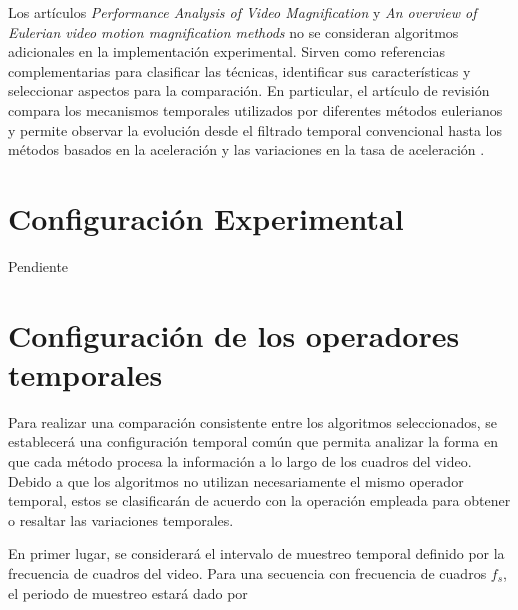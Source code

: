 Los artículos \textit{Performance Analysis of Video Magnification} y \textit{An overview of Eulerian video motion magnification methods} no se consideran algoritmos adicionales en la implementación experimental. Sirven como referencias complementarias para clasificar las técnicas, identificar sus características y seleccionar aspectos para la comparación. En particular, el artículo de revisión compara los mecanismos temporales utilizados por diferentes métodos eulerianos y permite observar la evolución desde el filtrado temporal convencional hasta los métodos basados en la aceleración y las variaciones en la tasa de aceleración \cite{ahmed2023overview,yadav2020performance}.\\









\section{Configuración Experimental}
Pendiente

\section{Configuración de los operadores temporales}

Para realizar una comparación consistente entre los algoritmos seleccionados, se establecerá una configuración temporal común que permita analizar la forma en que cada método procesa la información a lo largo de los cuadros del video. Debido a que los algoritmos no utilizan necesariamente el mismo operador temporal, estos se clasificarán de acuerdo con la operación empleada para obtener o resaltar las variaciones temporales.

En primer lugar, se considerará el intervalo de muestreo temporal definido por la frecuencia de cuadros del video. Para una secuencia con frecuencia de cuadros \(f_s\), el periodo de muestreo estará dado por

